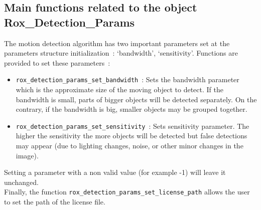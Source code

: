 \subsection{Main functions related to the object Rox\_Detection\_Params}
\label{sse:detection_params_functions}

The motion detection algorithm has two important parameters set at the parameters structure
initialization~: `bandwidth', `sensitivity'. Functions are provided to set these parameters~:

\begin{itemize}
  \item \lstinline$rox_detection_params_set_bandwidth$~: Sets the bandwidth parameter which is the approximate size of the moving object to detect. If the bandwidth is small, parts of bigger objects will be detected separately. On the contrary, if the   bandwidth is big, smaller objects may be grouped together. 
  \item \lstinline$rox_detection_params_set_sensitivity$~: Sets sensitivity parameter. The higher the sensitivity the more objects will be detected but false detections may appear (due to lighting changes, noise, or other minor changes in the image).
\end{itemize}

Setting a parameter with a non valid value (for example -1) will leave it unchanged. \\

Finally, the function \lstinline$rox_detection_params_set_license_path$ allows the user to set the path of the license file.
